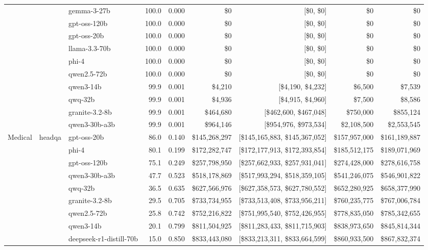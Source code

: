 \begin{table}[t]
\begin{tabular}{lllrrrrrr}
   &  & gemma-3-27b & 100.0 & 0.000 & \$0 & [\$0, \$0] & \$0 & \$0 \\
   &  & gpt-oss-120b & 100.0 & 0.000 & \$0 & [\$0, \$0] & \$0 & \$0 \\
   &  & gpt-oss-20b & 100.0 & 0.000 & \$0 & [\$0, \$0] & \$0 & \$0 \\
   &  & llama-3.3-70b & 100.0 & 0.000 & \$0 & [\$0, \$0] & \$0 & \$0 \\
   &  & phi-4 & 100.0 & 0.000 & \$0 & [\$0, \$0] & \$0 & \$0 \\
   &  & qwen2.5-72b & 100.0 & 0.000 & \$0 & [\$0, \$0] & \$0 & \$0 \\
   &  & qwen3-14b & 99.9 & 0.001 & \$4,210 & [\$4,190, \$4,232] & \$6,500 & \$7,539 \\
   &  & qwq-32b & 99.9 & 0.001 & \$4,936 & [\$4,915, \$4,960] & \$7,500 & \$8,586 \\
   &  & granite-3.2-8b & 99.9 & 0.001 & \$464,680 & [\$462,600, \$467,048] & \$750,000 & \$855,124 \\
   &  & qwen3-30b-a3b & 99.9 & 0.001 & \$964,146 & [\$954,976, \$973,534] & \$2,108,500 & \$2,553,545 \\
\midrule
  Medical & headqa & gpt-oss-20b & 86.0 & 0.140 & \$145,268,297 & [\$145,165,883, \$145,367,052] & \$157,957,000 & \$161,189,887 \\
   &  & phi-4 & 80.1 & 0.199 & \$172,282,747 & [\$172,177,913, \$172,393,854] & \$185,512,175 & \$189,071,969 \\
   &  & gpt-oss-120b & 75.1 & 0.249 & \$257,798,950 & [\$257,662,933, \$257,931,041] & \$274,428,000 & \$278,616,758 \\
   &  & qwen3-30b-a3b & 47.7 & 0.523 & \$518,178,869 & [\$517,993,294, \$518,359,105] & \$541,246,075 & \$546,901,822 \\
   &  & qwq-32b & 36.5 & 0.635 & \$627,566,976 & [\$627,358,573, \$627,780,552] & \$652,280,925 & \$658,377,990 \\
   &  & granite-3.2-8b & 29.5 & 0.705 & \$733,734,955 & [\$733,513,408, \$733,956,211] & \$760,235,775 & \$767,006,784 \\
   &  & qwen2.5-72b & 25.8 & 0.742 & \$752,216,822 & [\$751,995,540, \$752,426,955] & \$778,835,050 & \$785,342,655 \\
   &  & qwen3-14b & 20.1 & 0.799 & \$811,504,925 & [\$811,283,433, \$811,715,903] & \$838,973,650 & \$845,814,344 \\
   &  & deepseek-r1-distill-70b & 15.0 & 0.850 & \$833,443,080 & [\$833,213,311, \$833,664,599] & \$860,933,500 & \$867,832,374 \\

\end{tabular}
\end{table}
